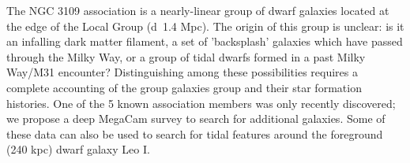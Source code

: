 
The NGC 3109 association is a nearly-linear group of dwarf galaxies located at the edge of the Local Group (d~1.4 Mpc). The origin of this group is unclear: is it an infalling dark matter filament, a set of 'backsplash' galaxies which have passed through the Milky Way, or a group of tidal dwarfs formed in a past Milky Way/M31 encounter? Distinguishing among these possibilities requires a complete accounting of the group galaxies group and their star formation histories. One of the 5 known association members was only recently discovered; we propose a deep MegaCam survey to search for additional galaxies. Some of these data can also be used to search for tidal features around the foreground (240 kpc) dwarf galaxy Leo I.

